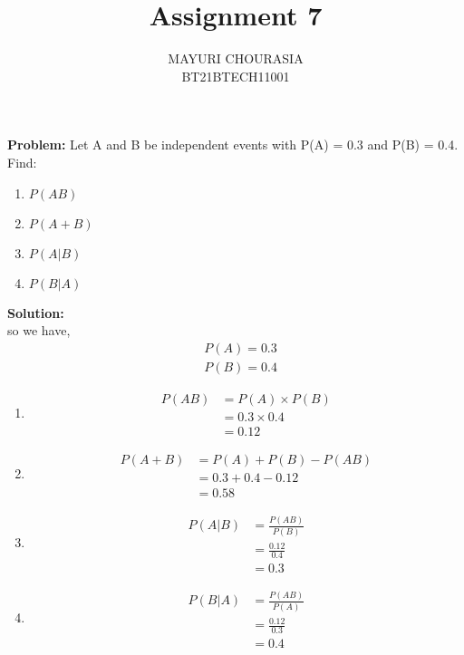 \documentclass[journal,12pt,twocolumn]{IEEEtran}
\title{Assignment 7}
\author{MAYURI CHOURASIA\\BT21BTECH11001}
\date{}
\newcommand{\PROBLEM}{\noindent \textbf{Problem: }}
\newcommand{\solution}{\noindent \textbf{Solution: }}
\begin{document}
\maketitle
\PROBLEM Let A and B be independent events with P(A) = 0.3 and P(B) = 0.4. Find:\\
\begin{enumerate}
    \item $P(AB)$
    \item $P(A + B)$
    \item $P(A|B)$
    \item $P(B|A)$
\end{enumerate}
\solution \\
so we have,\\
\begin{align}
    &P(A)=0.3\\
    &P(B)=0.4
\end{align}
\begin{enumerate}
\item \begin{align}
    P(AB) &= P(A)\times P(B)\\
    &= 0.3 \times 0.4\\
    &= 0.12
\end{align}

\item \begin{align}
P(A + B) &= P(A) + P(B) - P(AB)\\
&= 0.3 + 0.4 - 0.12\\
&=0.58
\end{align}
\item \begin{align}
    P(A | B) &= \frac{P(AB)}{P(B)}\\
&= \frac{0.12}{0.4}\\
&=0.3
\end{align}
\item \begin{align}
    P(B | A) &= \frac{P(AB)}{P(A)}\\
&= \frac{0.12}{0.3}\\
&=0.4
\end{align}
\end{enumerate}
\end{document}
